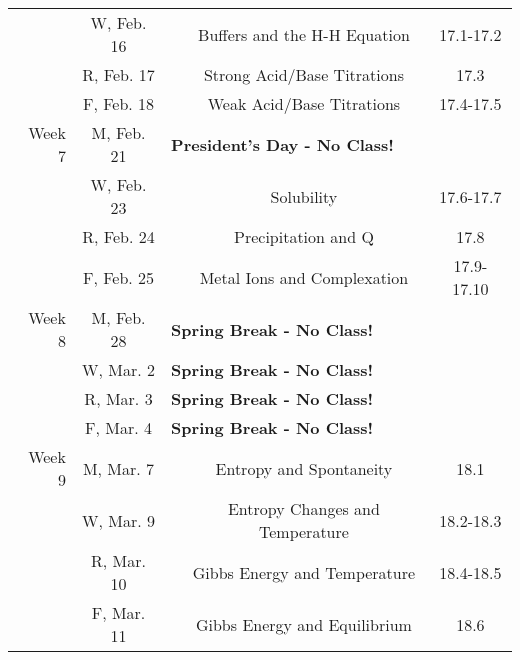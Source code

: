 \documentclass[12pt, letterpaper]{article}
\begin{document}
\begin{tabular}{rcccc}
	       & W, Feb. 16 &                                                                                & Buffers and the H-H Equation    & 17.1-17.2  \\
	       & R, Feb. 17 &                                                                                & Strong Acid/Base Titrations     & 17.3       \\
	       & F, Feb. 18 &                                                                                & Weak Acid/Base Titrations       & 17.4-17.5  \\
	\midrule
	Week 7 & M, Feb. 21 & \multicolumn{3}{l}{\textbf{President's Day - No Class!}}                                                                      \\
	       & W, Feb. 23 &                                                                                & Solubility                      & 17.6-17.7  \\
	       & R, Feb. 24 &                                                                                & Precipitation and Q             & 17.8       \\
	       & F, Feb. 25 &                                                                                & Metal Ions and Complexation     & 17.9-17.10 \\
	\midrule
	Week 8 & M, Feb. 28 & \multicolumn{3}{l}{\textbf{Spring Break - No Class!}}                                                                         \\
	       & W, Mar. 2  & \multicolumn{3}{l}{\textbf{Spring Break - No Class!}}                                                                         \\
	       & R, Mar. 3  & \multicolumn{3}{l}{\textbf{Spring Break - No Class!}}                                                                         \\
	       & F, Mar. 4  & \multicolumn{3}{l}{\textbf{Spring Break - No Class!}}                                                                         \\
	\midrule
	Week 9 & M, Mar. 7  &                                                                                & Entropy and Spontaneity         & 18.1       \\
	       & W, Mar. 9  &                                                                                & Entropy Changes and Temperature & 18.2-18.3  \\
	       & R, Mar. 10 &                                                                                & Gibbs Energy and Temperature    & 18.4-18.5  \\
	       & F, Mar. 11 &                                                                                & Gibbs Energy and Equilibrium    & 18.6       \\
\end{tabular}
\end{document}
